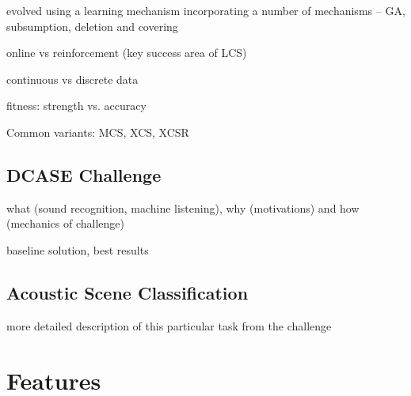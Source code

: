 \documentclass[11pt]{article}
\begin{document}
\begin{multicols}{2}
evolved using a learning mechanism incorporating a number of mechanisms -- GA, subsumption, deletion and covering

online vs reinforcement (key success area of LCS)

continuous vs discrete data

fitness: strength vs. accuracy

Common variants: MCS, XCS, XCSR




\subsection{DCASE Challenge}
\label{sec:DCASE}

what (sound recognition, machine listening), why (motivations) and how (mechanics of challenge)

baseline solution, best results


\subsection{Acoustic Scene Classification}
\label{sec:ASC}

more detailed description of this particular task from the challenge

\section{Features}
\label{sec:feat}

\end{multicols}
\end{document}

